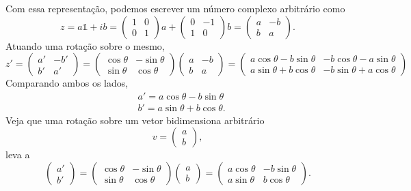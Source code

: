 \documentclass{article}
\numberwithin{equation}{section}
\numberwithin{figure}{section}
\begin{document}
Com essa representação, podemos escrever um número complexo arbitrário como 
\begin{equation}
	z=a\mathds{1}+ib=\begin{pmatrix}
		1 & 0 \\
		0 & 1
	\end{pmatrix}a+\begin{pmatrix}
	0 & -1 \\
	1 & 0
	\end{pmatrix}b=\begin{pmatrix}
	a & -b \\
	b & a
	\end{pmatrix}. 
\end{equation}
Atuando uma rotação sobre o mesmo, 
\begin{equation}
	z'=\begin{pmatrix}
		a' & -b' \\
		b' & a'
	\end{pmatrix}=\begin{pmatrix}
		\cos\theta & -\sin\theta \\
		\sin\theta & \cos\theta
	\end{pmatrix}\begin{pmatrix}
	a & -b \\
	b & a
	\end{pmatrix}=\begin{pmatrix}
	a\cos\theta -b\sin\theta  & -b\cos\theta -a\sin\theta  \\
	a\sin\theta +b\cos\theta  & -b\sin\theta  +a\cos\theta 
	\end{pmatrix}	
\end{equation}
Comparando ambos os lados, 
\begin{equation}\label{rotacao numero complexo}
	\begin{split}
		&a'=a\cos\theta-b\sin\theta \\
		&b'=a\sin\theta+b\cos\theta. 
	\end{split}
\end{equation}
Veja que uma rotação sobre um vetor bidimensiona arbitrário 
\begin{equation*}
	v=\begin{pmatrix}
		a \\
		b
	\end{pmatrix},
\end{equation*}
leva a 
\begin{equation}
	\begin{pmatrix}
		a' \\
		b'
	\end{pmatrix}=\begin{pmatrix}
		\cos\theta & -\sin\theta \\
		\sin\theta & \cos\theta
	\end{pmatrix}\begin{pmatrix}
	a \\
	b
	\end{pmatrix}=\begin{pmatrix}
	a\cos\theta & -b\sin\theta \\
	a\sin\theta & b\cos\theta
	\end{pmatrix}.
\end{equation}
\end{document}
